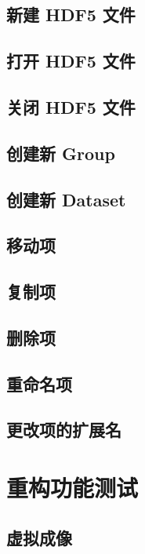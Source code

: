 \documentclass[a4paper,12pt]{report}	%
\begin{document}
\subsection{新建 HDF5 文件}

\subsection{打开 HDF5 文件}

\subsection{关闭 HDF5 文件}

\subsection{创建新 Group}

\subsection{创建新 Dataset}

\subsection{移动项}

\subsection{复制项}

\subsection{删除项}

\subsection{重命名项}

\subsection{更改项的扩展名}

\section{重构功能测试}

\subsection{虚拟成像}
\end{document}
